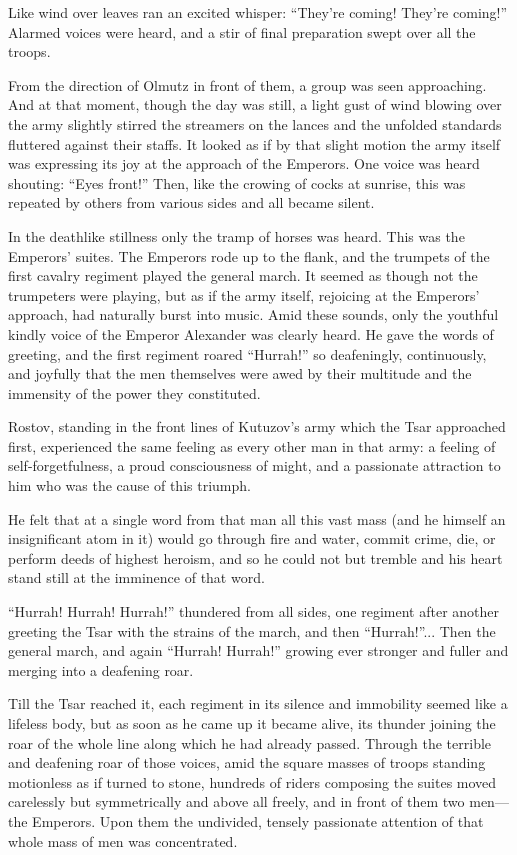 Like wind over leaves ran an excited whisper: ``They're coming!
They're coming!'' Alarmed voices were heard, and a stir of final
preparation swept over all the troops.

From the direction of Olmutz in front of them, a group was seen
approaching. And at that moment, though the day was still, a
light gust of wind blowing over the army slightly stirred the
streamers on the lances and the unfolded standards fluttered
against their staffs. It looked as if by that slight motion the
army itself was expressing its joy at the approach of the
Emperors. One voice was heard shouting: ``Eyes front!'' Then,
like the crowing of cocks at sunrise, this was repeated by others
from various sides and all became silent.

In the deathlike stillness only the tramp of horses was
heard. This was the Emperors' suites. The Emperors rode up to the
flank, and the trumpets of the first cavalry regiment played the
general march. It seemed as though not the trumpeters were
playing, but as if the army itself, rejoicing at the Emperors'
approach, had naturally burst into music. Amid these sounds, only
the youthful kindly voice of the Emperor Alexander was clearly
heard. He gave the words of greeting, and the first regiment
roared ``Hurrah!'' so deafeningly, continuously, and joyfully
that the men themselves were awed by their multitude and the
immensity of the power they constituted.

Rostov, standing in the front lines of Kutuzov's army which the
Tsar approached first, experienced the same feeling as every
other man in that army: a feeling of self-forgetfulness, a proud
consciousness of might, and a passionate attraction to him who
was the cause of this triumph.

He felt that at a single word from that man all this vast mass
(and he himself an insignificant atom in it) would go through
fire and water, commit crime, die, or perform deeds of highest
heroism, and so he could not but tremble and his heart stand
still at the imminence of that word.

``Hurrah! Hurrah! Hurrah!'' thundered from all sides, one
regiment after another greeting the Tsar with the strains of the
march, and then ``Hurrah!''... Then the general march, and again
``Hurrah! Hurrah!'' growing ever stronger and fuller and merging
into a deafening roar.

Till the Tsar reached it, each regiment in its silence and
immobility seemed like a lifeless body, but as soon as he came up
it became alive, its thunder joining the roar of the whole line
along which he had already passed. Through the terrible and
deafening roar of those voices, amid the square masses of troops
standing motionless as if turned to stone, hundreds of riders
composing the suites moved carelessly but symmetrically and above
all freely, and in front of them two men---the Emperors. Upon
them the undivided, tensely passionate attention of that whole
mass of men was concentrated.

